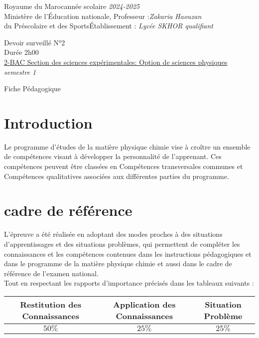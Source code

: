 \documentclass[12pt]{article}
\newcommand\headerMe[2]{\noindent{}#1\hfill#2}
\begin{document}
\headerMe{Royaume du Maroc}{année scolaire \emph{2024-2025}}\\
\headerMe{Ministère de l'Éducation nationale, }{  Professeur :\emph{Zakaria Haouzan}}\\
\headerMe{du Préscolaire et des Sports}{Établissement : \emph{Lycée SKHOR qualifiant}}\\

\begin{center}
Devoir surveillé N°2 \\
Durée 2h00\\
\underline{2-BAC Section des sciences expérimentales: Option de sciences physiques}\\
  \emph{semestre 1}

    \vspace{.2cm}
\hrulefill
\Large{Fiche Pédagogique}
\hrulefill\\
\end{center}


\section[A]{Introduction }
\hspace{0.5cm}Le programme d'études de la matière physique chimie vise à croître un ensemble de compétences visant à développer la personnalité de l'apprenant. Ces compétences peuvent être classées en Compétences transversales communes et Compétences qualitatives associées aux différentes parties du programme.
\section{cadre de référence }
 \hspace{0.5cm}L'épreuve a été réalisée en adoptant des modes proches à des situations d'apprentissages et des situations problèmes, qui permettent de compléter les connaissances et les compétences contenues dans les instructions pédagogiques et dans le programme de la matière physique chimie et aussi dans le cadre de référence de l'examen national. 
 \\Tout en respectant les rapports d'importance précisés dans les tableaux suivants :
 \begin{center}
\begin{tabular}{|c||c||c|}
\hline
    \textbf{Restitution des Connaissances} & \textbf{Application des Connaissances} & \textbf{Situation Problème }\\
    \hline 
    $50\%$ & $25\%$ & $25\%$\\
    \hline
\end{tabular} 
\end{center}
\end{document}
